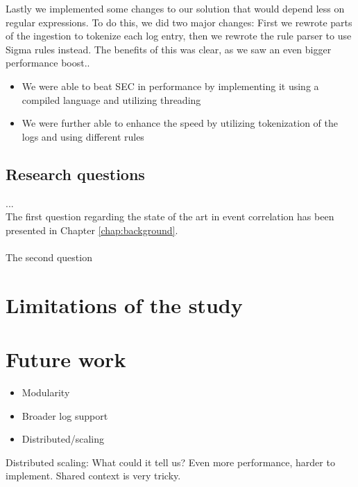 Lastly we implemented some changes to our solution that would depend less on regular expressions. To do this, we did two major changes: First we rewrote parts of the ingestion to tokenize each log entry, then we rewrote the rule parser to use Sigma rules instead. The benefits of this was clear, as we saw an even bigger performance boost..


\iffalse
high signal low noise
1000 = 40.17%
10 000 = 34.19%
100 000 = 22.78%
1 000 000 = 20.5%

baseline
1000 = 89.5%
10 000 = 135.7%
100 000 = 127%
1 000 000 = 101.1%

\fi
\begin{itemize}
    \item We were able to beat SEC in performance by implementing it using a compiled language and utilizing threading
    \item We were further able to enhance the speed by utilizing tokenization of the logs and using different rules
\end{itemize}


\subsection{Research questions}
...\\
The first question regarding the state of the art in event correlation has been presented in Chapter \ref{chap:background}.\\
\\
The second question 







\section{Limitations of the study}
\label{sec:limitations}

\section{Future work}
\label{sec:futurework}

\begin{itemize}
    \item Modularity
    \item Broader log support
    \item Distributed/scaling
\end{itemize}

Distributed scaling: What could it tell us? Even more performance, harder to implement. Shared context is very tricky.

